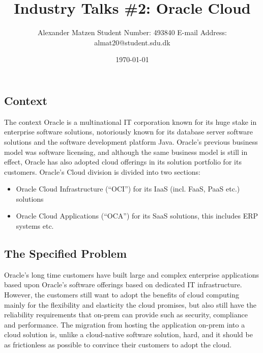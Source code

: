 \documentclass[11pt]{article}
\begin{document}
\setlength\parindent{0pt}
\setlength{\parskip}{.15em}
\pagestyle{empty}

\title{Industry Talks \#2: Oracle Cloud}
\author{Alexander Matzen \addvspace{1em} Student Number: 493840 \newline E-mail Address: almat20@student.sdu.dk}
\date{\today}


\pagecolor{white}


\subsection*{Context}
The context
Oracle is a multinational IT corporation known for its huge stake in enterprise software solutions, notoriously known for its database server software solutions and the software development platform Java. Oracle’s previous business model was software licensing, and although the same business model is still in effect, Oracle has also adopted cloud offerings in its solution portfolio for its customers. Oracle’s Cloud division is divided into two sections:
\begin{itemize}
	\item Oracle Cloud Infrastructure (“OCI”) for its IaaS (incl. FaaS, PaaS etc.) solutions
	\item Oracle Cloud Applications (“OCA”) for its SaaS solutions, this includes ERP systems etc.
\end{itemize}

\subsection*{The Specified Problem}
Oracle’s long time customers have built large and complex enterprise applications based upon Oracle’s software offerings based on dedicated IT infrastructure. However, the customers still want to adopt the benefits of cloud computing mainly for the flexibility and elasticity the cloud promises, but also still have the reliability requirements that on-prem can provide such as security, compliance and performance. The migration from hosting the application on-prem into a cloud solution is, unlike a cloud-native software solution, hard, and it should be as frictionless as possible to convince their customers to adopt the cloud.
\end{document}
